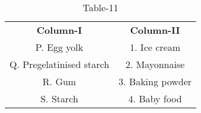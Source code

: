 \begin{table}[htbp]
  \centering
  \caption{Table-11}
  \label{table11}
  \begin{tabular}{cc}
\textbf{Column-I} & \textbf{Column-II}\\

P. Egg yolk & 1. Ice cream \\
Q. Pregelatinised starch & 2. Mayonnaise \\
R. Gum & 3. Baking powder \\
S. Starch & 4. Baby food \\
  
  
  
  \end{tabular}
\end{table}